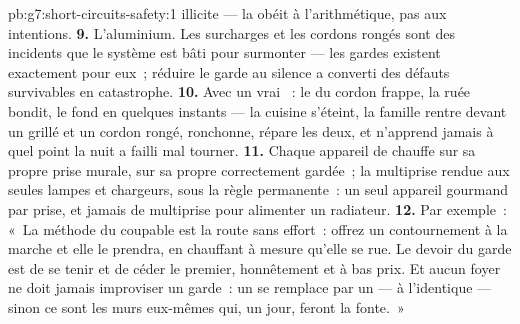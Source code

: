 \begin{solution}{pb:g7:short-circuits-safety:1}
illicite --- la  obéit à l'arithmétique, pas aux intentions.
\textbf{9.} L'aluminium. Les surcharges et les cordons rongés sont
des incidents que le système est bâti pour surmonter --- les gardes
existent exactement pour eux~; réduire le garde au silence a converti
des défauts survivables en catastrophe.
\textbf{10.} Avec un vrai ~: le  du cordon
frappe, la ruée bondit, le  fond en quelques instants --- la
cuisine s'éteint, la famille rentre devant un  grillé et un
cordon rongé, ronchonne, répare les deux, et n'apprend jamais à quel
point la nuit a failli mal tourner.
\textbf{11.} Chaque appareil de chauffe sur sa propre prise murale,
sur sa propre  correctement gardée~; la multiprise rendue aux
seules lampes et chargeurs, sous la règle permanente~: un seul
appareil gourmand par prise, et jamais de multiprise pour alimenter
un radiateur.
\textbf{12.} Par exemple~: «~La méthode du coupable est la route sans
effort~: offrez un contournement à la marche et elle le prendra, en
chauffant à mesure qu'elle se rue. Le devoir du garde est de se tenir
 et de céder le premier, honnêtement et à bas prix. Et aucun
foyer ne doit jamais improviser un garde~: un  se remplace par
un  --- à l'identique --- sinon ce sont les murs eux-mêmes
qui, un jour, feront la fonte.~»
\end{solution}
